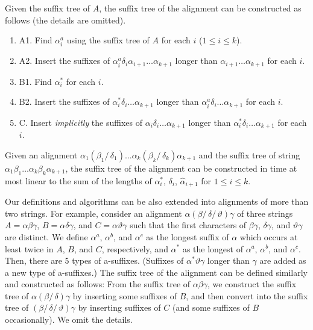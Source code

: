 \documentclass{llncs}
\newcommand{\partitle}[1]{}                        \newcommand{\commentout}[1]{}
\newcommand{\be}{\begin{enumerate}}
\newcommand{\ee}{\end{enumerate}}
\begin{document}
Given the suffix tree of $A$,
 the suffix tree of the alignment can be constructed as follows
 (the details are omitted).
\be
\item[A1.] Find $\alpha^{a}_{i}$ using the suffix tree of $A$ for each $i$ ($1 \le i \le k$).
\item[A2.] Insert the suffixes of
         $\alpha^{a}_{i} \delta_i \alpha_{i+1} \ldots \alpha_{k+1}$
         longer than $\alpha_{i+1}\ldots\alpha_{k+1}$ for each $i$.
\item[B1.] Find $\alpha^{*}_{i}$ for each $i$.
\item[B2.] Insert the suffixes of
         $\alpha^{*}_{i} \delta_i  \ldots \alpha_{k+1}$
         longer than $\alpha^{a}_{i} \delta_i  \ldots \alpha_{k+1}$ for each $i$.
\item[C.] Insert {\em implicitly}
         the suffixes of $\alpha_{i} \delta_i  \ldots \alpha_{k+1}$
         longer than $\alpha^{*}_{i} \delta_i  \ldots \alpha_{k+1}$
for each $i$.
\ee

\begin{theorem}
Given an alignment
 $\alpha_1 (\beta_1 /\, \delta_1) \ldots \alpha_k (\beta_k /\, \delta_k) \alpha_{k+1}$
 and the suffix tree of string
 $\alpha_1 \beta_1 \ldots \alpha_k \beta_k \alpha_{k+1}$,
 the suffix tree of the alignment
 can be constructed in time at most linear to
 the sum of the lengths of $\alpha^{*}_i$, $\delta_i$, $\hat{\alpha}_{i+1}$
 for $1 \le i \le k$.
\end{theorem}


\partitle{3 strings}

Our definitions and algorithms can be also extended into
 alignments of more than two strings.
For example, consider an alignment $\alpha (\beta /\, \delta /\,\vartheta) \gamma$
 of three strings $A=\alpha\beta\gamma$, $B=\alpha\delta\gamma$, and $C=\alpha\vartheta\gamma$
 such that the first characters of $\beta\gamma$, $\delta\gamma$, and $\vartheta\gamma$
 are distinct.
We define $\alpha^{a}$, $\alpha^{b}$, and $\alpha^{c}$ as
 the longest suffix of $\alpha$ which occurs at least twice in $A$, $B$, and $C$, respectively,
 and $\alpha^{*}$ as the longest of $\alpha^{a}$, $\alpha^{b}$, and $\alpha^{c}$.
Then, there are 5 types of a-suffixes.
(Suffixes of $\alpha^{*} \vartheta \gamma$ longer than $\gamma$
  are added as a new type of a-suffixes.)
The suffix tree of the alignment can be defined similarly and constructed as follows:
 From the suffix tree of $\alpha\beta\gamma$,
 we construct the suffix tree of $\alpha (\beta /\, \delta ) \gamma$
  by inserting some suffixes of $B$,
 and then convert into the suffix tree of $(\beta /\, \delta /\,\vartheta) \gamma$
  by inserting suffixes of $C$ (and some suffixes of $B$ occasionally).
We omit the details.
\end{document}
